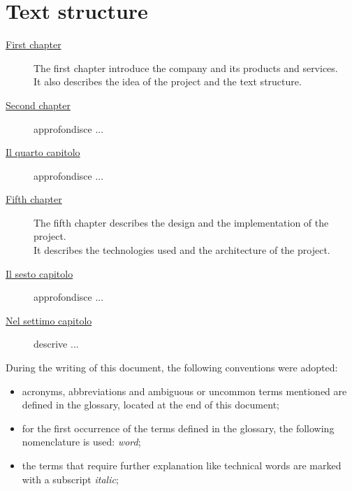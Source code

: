 \section{Text structure}

\begin{description}
    \item[{\hyperref[cap:Introduction]{First chapter}}] 
    The first chapter introduce the company and its products and services.\\
    It also describes the idea of the project and the text structure.

    
    \item[{\hyperref[cap:descrizione-stage]{Second chapter}}] approfondisce ...
    
    \item[{\hyperref[cap:analisi-requisiti]{Il quarto capitolo}}] approfondisce ...
    
    \item[{\hyperref[cap:design-coding]{Fifth chapter}}] The fifth chapter describes the design and the implementation of the project. \\
    It describes the technologies used and the architecture of the project.
    
    \item[{\hyperref[cap:verifica-validazione]{Il sesto capitolo}}] approfondisce ...
    
    \item[{\hyperref[cap:conclusioni]{Nel settimo capitolo}}] descrive ...
\end{description}

During the writing of this document, the following conventions were adopted:
\begin{itemize}
    \item acronyms, abbreviations and ambiguous or uncommon terms mentioned are defined in the glossary, located at the end of this document;
    \item for the first occurrence of the terms defined in the glossary, the following nomenclature is used: \emph{word}\glsfirstoccur;
	\item the terms that require further explanation like technical words are marked with a subscript \emph{italic};
\end{itemize}
